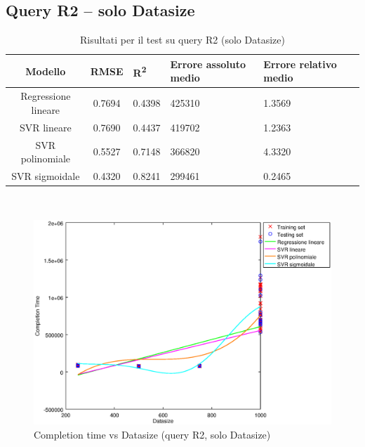 \documentclass[a4paper,11pt]{article}
\begin{document}
\newpage
\subsection{Query R2 -- solo Datasize}
\begin{table}[bhpt]
	\centering
	\begin{adjustbox}{center}
		\begin{tabular}{c | c M{1cm} M{2.5cm} M{2.5cm} M{1.8cm}}
			Modello & RMSE & R\textsuperscript{2} & Errore assoluto medio & Errore relativo medio \tabularnewline
			\hline
			Regressione lineare & 0.7694 & 0.4398 & 425310 & 1.3569 \\
			SVR lineare & 0.7690 & 0.4437 & 419702 & 1.2363 \\
			SVR polinomiale & 0.5527 & 0.7148 & 366820 & 4.3320 \\
			SVR sigmoidale & 0.4320 & 0.8241 & 299461 & 0.2465 \\
		\end{tabular}
	\end{adjustbox}
	\\
	\caption{Risultati per il test su query R2 (solo Datasize)}
	\label{table_R2_datasize}
\end{table}

\begin {figure}[hbtp]
\centering
\includegraphics[width=\textwidth]{output/R2_SOLO_DATASIZE/plot_R2.eps}
\caption {Completion time vs Datasize (query R2, solo Datasize)}
\end {figure}

\newpage
\end{document}
